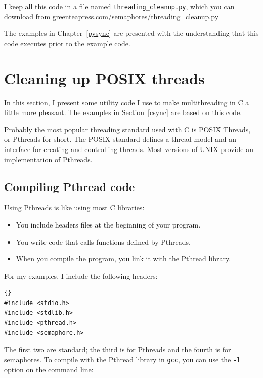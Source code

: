 \documentclass{book}
\begin{document}
I keep all this code in a file named {\tt threading\_cleanup.py},
which you can download from
\url{greenteapress.com/semaphores/threading\_cleanup.py}


The examples in Chapter~\ref{pysync} are presented with the understanding
that this code executes prior to the example code.


\chapter{Cleaning up POSIX threads}
\label{ccleanup}

In this section, I present some utility code I use to make
multithreading in C a little more pleasant.  The examples in
Section~\ref{csync} are based on this code.

Probably the most popular threading standard used with C is
POSIX Threads, or Pthreads for short.  The POSIX standard defines
a thread model and an interface for creating and controlling
threads.  Most versions of UNIX provide an implementation of
Pthreads.

\section{Compiling Pthread code}

Using Pthreads is like using most C libraries:

\begin{itemize}

\item You include headers files at the beginning of your
program.

\item You write code that calls functions defined by Pthreads.

\item When you compile the program, you link it with the
Pthread library.

\end{itemize}

For my examples, I include the following headers:

\begin{latin}
\begin{lstlisting}[title={Headers}]{}
#include <stdio.h>
#include <stdlib.h>
#include <pthread.h>
#include <semaphore.h>
\end{lstlisting}
\end{latin}

The first two are standard; the third is for Pthreads and
the fourth is for semaphores.
To compile with the Pthread library in {\tt gcc}, you
can use the {\tt -l}
option on the command line:
\end{document}
